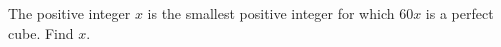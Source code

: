 The positive integer $x$ is the smallest positive integer for which $60x$ is a perfect cube. Find $x$.
